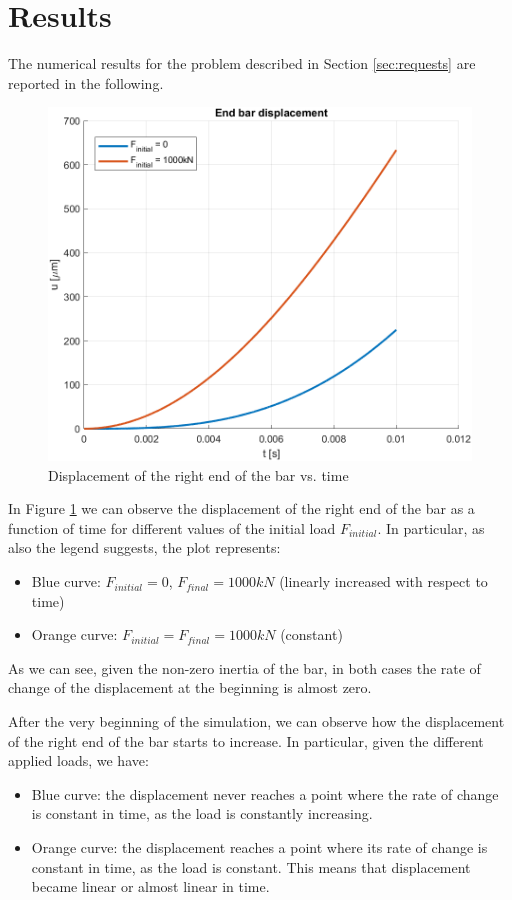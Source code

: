 \section{Results}
\label{sec:results}

The numerical results for the problem described in Section \ref{sec:requests} are reported in the following.

\begin{figure}[H]
    \centering
    \includegraphics[width=.8\textwidth]{img/end_bar_displacement}
    \caption{Displacement of the right end of the bar vs. time}
    \label{fig:final_displacement}
\end{figure}

In Figure \ref{fig:final_displacement} we can observe the displacement of the right end of the bar as a function of time for different values of the initial load $F_{initial}$.
In particular, as also the legend suggests, the plot represents:

\begin{itemize}
    \item Blue curve: $F_{initial} = 0$, $F_{final} = 1000kN$ (linearly increased with respect to time)
    \item Orange curve: $F_{initial} = F_{final} = 1000kN$ (constant)
\end{itemize}

As we can see, given the non-zero inertia of the bar, in both cases the rate of change of the displacement at the beginning is almost zero.

After the very beginning of the simulation, we can observe how the displacement of the right end of the bar starts to increase.
In particular, given the different applied loads, we have:

\begin{itemize}
    \item Blue curve: the displacement never reaches a point where the rate of change is constant in time, as the load is constantly increasing.
    \item Orange curve: the displacement reaches a point where its rate of change is constant in time, as the load is constant. This means that displacement became linear or almost linear in time.
\end{itemize}

